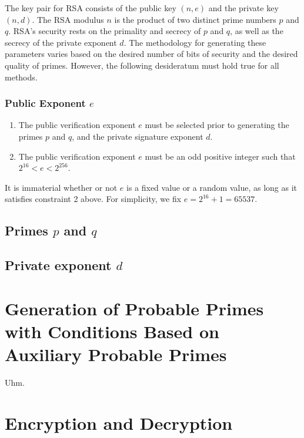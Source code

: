 \documentclass[a4paper]{article}
\begin{document}
The key pair for RSA consists of the public key $(n, e)$ and the private key $(n, d)$. The RSA modulus $n$ is the product of two distinct prime numbers $p$ and $q$. RSA's security rests on the primality and secrecy of $p$ and $q$, as well as the secrecy of the private exponent $d$. The methodology for generating these parameters varies based on the desired number of bits of security and the desired quality of primes. However, the following desideratum must hold true for all methods.

\subsubsection{Public Exponent $e$}

\begin{enumerate}
    \item The public verification exponent $e$ must be selected prior to generating the primes $p$ and $q$, and the private signature exponent $d$.

    \item The public verification exponent $e$ must be an odd positive integer such that $2^{16} < e < 2^{256}$.

\end{enumerate}

It is immaterial whether or not $e$ is a fixed value or a random value, as long as it satisfies constraint 2 above. For simplicity, we fix $e = 2^{16} + 1 = 65537$.

\subsection{Primes $p$ and $q$}


\subsection{Private exponent $d$}
\section{Generation of Probable Primes with Conditions Based on Auxiliary Probable Primes}

Uhm.

\section{Encryption and Decryption}



\end{document}
